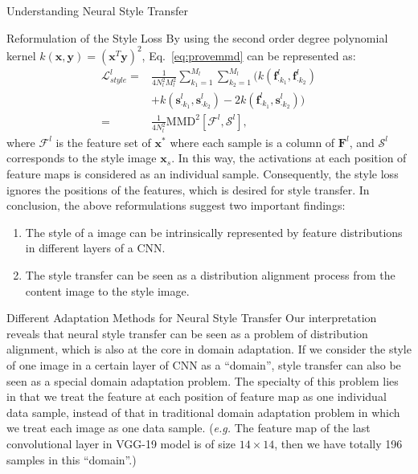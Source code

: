 \documentclass{article}
\newcommand{\col}[2]{#1_{\cdot #2}}
\begin{document}
\begin{section}{Understanding Neural Style Transfer}
\begin{subsection}{Reformulation of the Style Loss}
By using the second order degree polynomial kernel $k(\mathbf{x}, \mathbf{y}) = (\mathbf{x}^T\mathbf{y})^2$, Eq.~\ref{eq:provemmd} can be represented as:
\begin{equation}\label{eq:prove_result}
\begin{aligned}
\mathcal{L}_{style}^l =& \frac{1}{4N_l^2M_l^2}\sum_{k_1=1}^{M_l}\sum_{k_2=1}^{M_l}  
	\Big( k(\col{\mathbf{f}^l}{k_1}, \col{\mathbf{f}^l}{k_2}) \\
		 & + k(\col{\mathbf{s}^l}{k_1}, \col{\mathbf{s}^l}{k_2}) 
		 - 2k(\col{\mathbf{f}^l}{k_1}, \col{\mathbf{s}^l}{k_2})
	\Big)\\
	=& \frac{1}{4N_l^2} \text{MMD}^2[\mathcal{F}^{l}, \mathcal{S}^{l}],
\end{aligned}
\end{equation}
where $\mathcal{F}^{l}$ is the feature set of $\mathbf{x}^*$ where each sample is a column of $\mathbf{F}^l$, and $\mathcal{S}^{l}$ corresponds to the style image $\mathbf{x}_s$. In this way, the activations at each position of feature maps is considered as an individual sample. Consequently, the style loss ignores the positions of the features, which is desired for style transfer. In conclusion, the above reformulations suggest two important findings:
\begin{enumerate}
\item The style of a image can be intrinsically represented by feature distributions in different layers of a CNN.
\item The style transfer can be seen as a distribution alignment process from the content image to the style image. 
\end{enumerate}
\end{subsection}

\begin{subsection}{Different Adaptation Methods for Neural Style Transfer}\label{sec:methods}
Our interpretation reveals that neural style transfer can be seen as a problem of distribution alignment, which is also at the core in domain adaptation. If we consider the style of one image in a certain layer of CNN as a ``domain'', style transfer can also be seen as a special domain adaptation problem. The specialty of this problem lies in that we treat the feature at each position of feature map as one individual data sample, instead of that in traditional domain adaptation problem in which we treat each image as one data sample. (\emph{e.g.} The feature map of the last convolutional layer in VGG-19 model is of size $14 \times 14$, then we have totally 196 samples in this ``domain''.)


\end{subsection}
\end{section}
\end{document}
